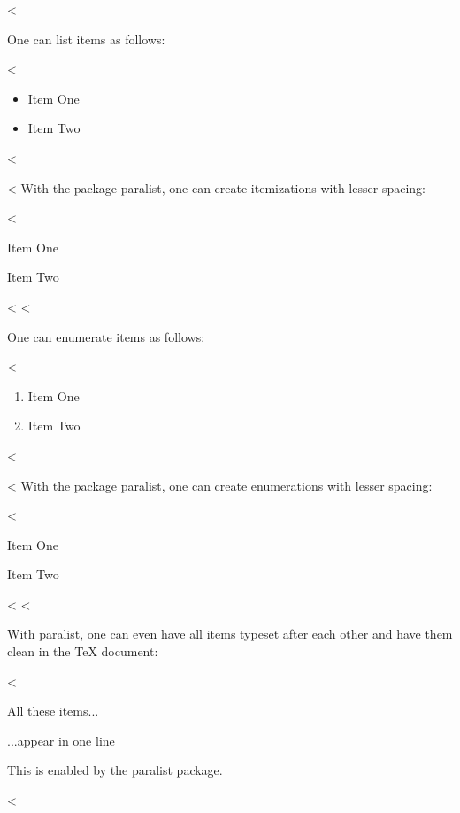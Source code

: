<%

One can list items as follows:

<%
\begin{itemize}
\item Item One
\item Item Two
\end{itemize}
<%

<%
With the package paralist, one can create itemizations with lesser spacing:

<%
\begin{compactitem}
\item Item One
\item Item Two
\end{compactitem}
<%
<%

One can enumerate items as follows:

<%
\begin{enumerate}
  \item Item One
  \item Item Two
\end{enumerate}
<%

<%
With the package paralist, one can create enumerations with lesser spacing:

<%
\begin{compactenum}
  \item Item One
  \item Item Two
\end{compactenum}
<%
<%

With paralist, one can even have all items typeset after each other and have them clean in the TeX document:

<%
\begin{inparaenum}
  \item All these items...
  \item ...appear in one line
  \item This is enabled by the paralist package.
\end{inparaenum}
<%
